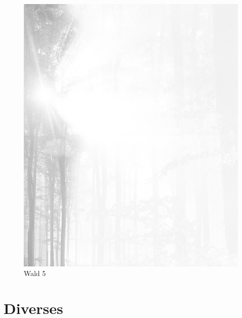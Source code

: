\documentclass[ngerman,a4paper,11pt]{scrreprt}
\begin{document}
\begin{figure}[H]
\centering
\includegraphics[width=\textwidth,height=.8\textheight,keepaspectratio]{Bilder/Bilder/750_028_59925_sz_todes_ta_.png}
\caption{\label{img_Wald_5}Wald 5}
\end{figure}

\chapter{Diverses}
\label{sec-3-4}
\end{document}
